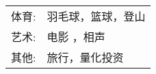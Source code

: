 %
%



\begin{tabular}{rl}
    \textsc{体育:} & 羽毛球，篮球，登山 \\
    \textsc{艺术:} & 电影 ，相声\\
    \textsc{其他:} & 旅行，量化投资\\
\end{tabular}
